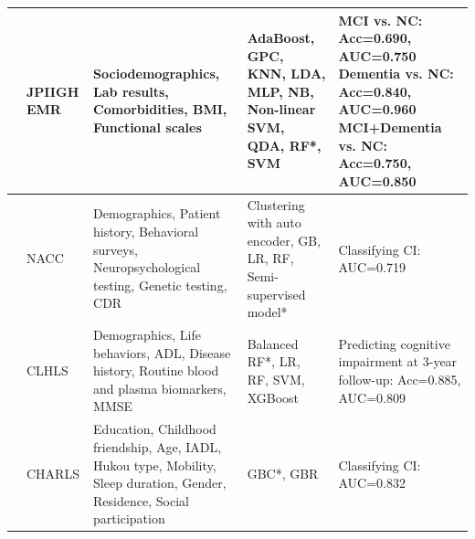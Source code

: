 \begin{landscape}
\begin{longtable}{|M{0.15\textwidth}|M{0.15\textwidth}|M{0.4\textwidth}|M{0.3\textwidth}|M{0.5\textwidth}|}
\cite{Richter2025Cognitive} & JPIIGH EMR & Sociodemographics, Lab results, Comorbidities, BMI, Functional scales & AdaBoost, GPC, KNN, \acrshort{LDA}, MLP, NB, Non-linear SVM, QDA, RF*, SVM & MCI vs. NC: Acc=0.690, AUC=0.750 \newline Dementia vs. NC: Acc=0.840, AUC=0.960 \newline MCI+Dementia vs. NC: Acc=0.750, AUC=0.850 \\ 
\hline

\cite{Ren2025Identifying} & NACC & Demographics, Patient history, Behavioral surveys, Neuropsychological testing, Genetic testing, CDR & Clustering with auto encoder, GB, LR, RF, Semi-supervised model* & Classifying CI: AUC=0.719 \\ 
\hline

\cite{Ren2025Using} & CLHLS & Demographics, Life behaviors, ADL, Disease history, Routine blood and plasma biomarkers, MMSE & Balanced RF*, LR, RF, SVM, XGBoost & Predicting cognitive impairment at 3-year follow-up: Acc=0.885, AUC=0.809 \\
\hline

\cite{Ye2025Predicting} & CHARLS & Education, Childhood friendship, Age, IADL, Hukou type, Mobility, Sleep duration, Gender, Residence, Social participation & GBC*, GBR & Classifying CI: AUC=0.832 \\
\hline

\end{longtable}
\end{landscape}

